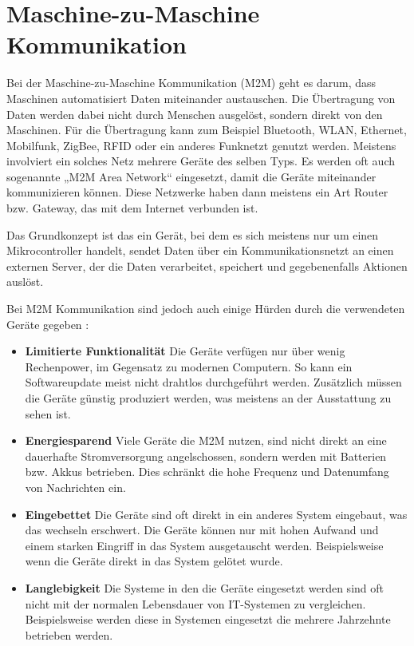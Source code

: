 \section{Maschine-zu-Maschine Kommunikation}
Bei der Maschine-zu-Maschine Kommunikation (\ac{M2M}) geht es darum, dass Maschinen automatisiert Daten miteinander austauschen. Die Übertragung von Daten werden dabei nicht durch Menschen ausgelöst, sondern direkt von den Maschinen. Für die Übertragung kann zum Beispiel Bluetooth, WLAN, Ethernet, Mobilfunk, ZigBee, RFID oder ein anderes Funknetzt genutzt werden.  Meistens involviert ein solches Netz mehrere Geräte des selben Typs. Es werden oft auch sogenannte „M2M Area Network“ eingesetzt, damit die Geräte miteinander kommunizieren können. Diese Netzwerke haben dann meistens ein Art Router bzw. Gateway, das mit dem Internet verbunden ist.  

Das Grundkonzept ist das ein Gerät, bei dem es sich meistens nur um einen Mikrocontroller handelt, sendet Daten über ein Kommunikationsnetzt an einen externen Server, der die Daten verarbeitet, speichert und gegebenenfalls Aktionen auslöst.

Bei M2M Kommunikation sind jedoch auch einige Hürden durch die verwendeten Geräte gegeben \cite[S. 4f]{boswarthick2012m2m}: 
\begin{itemize}
	\item \textbf{Limitierte  Funktionalität} Die Geräte verfügen nur über wenig Rechenpower, im Gegensatz zu modernen Computern. So kann ein Softwareupdate meist nicht drahtlos durchgeführt werden. Zusätzlich müssen die Geräte günstig produziert werden, was meistens an der Ausstattung zu sehen ist. 
	\item \textbf{Energiesparend } Viele Geräte die M2M nutzen, sind nicht direkt an eine dauerhafte Stromversorgung angelschossen, sondern werden mit Batterien bzw. Akkus betrieben. Dies schränkt die hohe Frequenz und Datenumfang von Nachrichten ein. 
	\item \textbf{Eingebettet } Die Geräte sind oft direkt in ein anderes System eingebaut, was das wechseln erschwert. Die Geräte können nur mit hohen Aufwand und einem starken Eingriff in das System ausgetauscht werden. Beispielsweise wenn die Geräte direkt in das System gelötet wurde.
	\item \textbf{Langlebigkeit } Die Systeme in den die Geräte eingesetzt werden sind oft nicht mit der normalen Lebensdauer von IT-Systemen zu vergleichen. Beispielsweise werden diese in Systemen eingesetzt die mehrere Jahrzehnte betrieben werden. 
\end{itemize}

